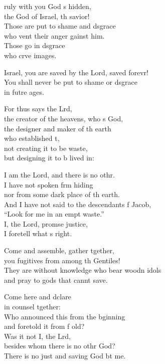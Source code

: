 \begin{psalmverse}
  \begin{patverse}
    ruly with you God \pointup{\i}s hidden,\Med\\
the God of Israel, th savior!\\
Those are put to shame and d\pointup{\i}sgrace\Med\\
who vent their anger gainst him.\\
Those go in d\pointup{\i}sgrace\Med\\
who crve images.

Israel, you are saved by the Lord, saved forevr!\Flex\\
You shall never be put to shame or d\pointup{\i}sgrace\Med\\
in futre ages.

For thus says the Lrd,\Flex\\
the creator of the heavens, who \pointup{\i}s God,\Med\\
the designer and maker of th earth\\
who established \pointup{\i}t,\Flex\\
not creating it to be  waste,\Med\\
but designing it to b lived in:

I am the Lord, and there is no othr.\Flex\\
I have not spoken frm hiding\Med\\
nor from some dark place of th earth.\\
And I have not said to the descendants f Jacob,\Med\\
“Look for me in an empt waste.”\\
I, the Lord, prom\pointup{\i}se justice,\Med\\
I foretell what \pointup{\i}s right.

Come and assemble, gather tgether,\Med\\
you fugitives from among th Gentiles!\\
They are without knowledge who bear woodn idols\Med\\
and pray to gods that cannt save.

Come here and dclare\Med\\
in counsel tgether:\\
Who announced this from the bginning\Med\\
and foretold it from f old?\\
Was it not I, the Lrd,\Flex\\
besides whom there is no othr God?\Med\\
There is no just and saving God bt me.


\end{patverse}
\end{psalmverse}
